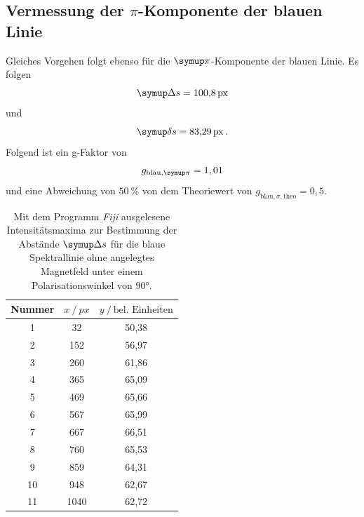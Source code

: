\subsection{Vermessung der \texorpdfstring{$\pi$}{pi}-Komponente der blauen Linie}
Gleiches Vorgehen folgt ebenso für die $\pii$-Komponente der blauen Linie.
Es folgen
\begin{equation}
  \Deltaup s=\SI{100,8}{px}
\end{equation}
und
\begin{equation}
  \deltaup s=\SI{83,29}{px}\,.
\end{equation}
Folgend ist ein g-Faktor von
\begin{equation}
  g_{\text{blau},\pii}=1,01
\end{equation}
und eine Abweichung von $\SI{50}{\%}$ von dem Theoriewert von $g_{\text{blau},\sigma,\text{theo}}=0,5$.
\begin{table}[H]
  \centering
  \caption{Mit dem Programm \textit{Fiji} \cite{Fiji} ausgelesene Intensitätsmaxima zur Bestimmung der Abstände $\Deltaup s$ für die blaue Spektrallinie ohne angelegtes Magnetfeld unter einem Polarisationswinkel von $90°$.}
  \label{tab:piblau0mT}
  \begin{tabular}{c|cc}
    \toprule
    {Nummer} & {$x \:/\: \si{px}$} & {$y \:/\: \text{bel. Einheiten}$}\\
    \midrule
 1 &  32   &	 50,38 \\
 2 &  152  &	 56,97 \\
 3 &  260  &	 61,86 \\
 4 &  365  &	 65,09 \\
 5 &  469  &	 65,66 \\
 6 &  567  &	 65,99 \\
 7 &  667  &	 66,51 \\
 8 &  760  &	 65,53\\
 9 &  859  &   64,31 \\
10 &  948  &	 62,67 \\
11 &  1040  &	 62,72 \\
  \end{tabular}
\end{table}

